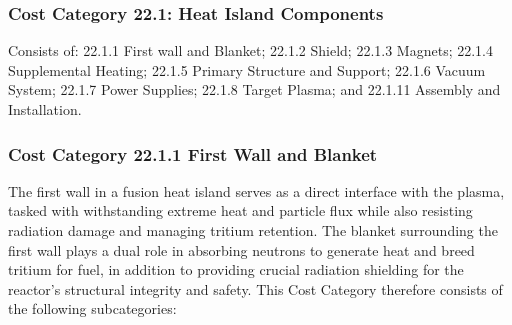 
\subsubsection{Cost Category 22.1: Heat Island Components}

Consists of: 22.1.1 First wall and Blanket; 22.1.2 Shield; 22.1.3 Magnets; 22.1.4 Supplemental Heating; 22.1.5 Primary Structure and Support; 22.1.6 Vacuum System; 22.1.7 Power Supplies; 22.1.8 Target Plasma; and 22.1.11 Assembly and Installation. 


\subsubsection*{Cost Category 22.1.1 First Wall and Blanket} 

The first wall in a fusion heat island serves as a direct interface with the plasma, tasked with withstanding extreme heat and particle flux while also resisting radiation damage and managing tritium retention. The blanket surrounding the first wall plays a dual role in absorbing neutrons to generate heat and breed tritium for fuel, in addition to providing crucial radiation shielding for the reactor's structural integrity and safety.  This Cost Category therefore consists of the following subcategories:



